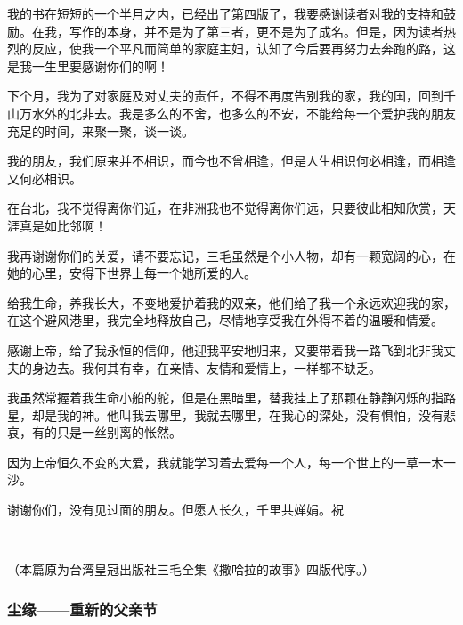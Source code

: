 \par 我的书在短短的一个半月之内，已经出了第四版了，我要感谢读者对我的支持和鼓励。在我，写作的本身，并不是为了第三者，更不是为了成名。但是，因为读者热烈的反应，使我一个平凡而简单的家庭主妇，认知了今后要再努力去奔跑的路，这是我一生里要感谢你们的啊！
\par 下个月，我为了对家庭及对丈夫的责任，不得不再度告别我的家，我的国，回到千山万水外的北非去。我是多么的不舍，也多么的不安，不能给每一个爱护我的朋友充足的时间，来聚一聚，谈一谈。
\par 我的朋友，我们原来并不相识，而今也不曾相逢，但是人生相识何必相逢，而相逢又何必相识。
\par 在台北，我不觉得离你们近，在非洲我也不觉得离你们远，只要彼此相知欣赏，天涯真是如比邻啊！
\par 我再谢谢你们的关爱，请不要忘记，三毛虽然是个小人物，却有一颗宽阔的心，在她的心里，安得下世界上每一个她所爱的人。
\par 给我生命，养我长大，不变地爱护着我的双亲，他们给了我一个永远欢迎我的家，在这个避风港里，我完全地释放自己，尽情地享受我在外得不着的温暖和情爱。
\par 感谢上帝，给了我永恒的信仰，他迎我平安地归来，又要带着我一路飞到北非我丈夫的身边去。我何其有幸，在亲情、友情和爱情上，一样都不缺乏。
\par 我虽然常握着我生命小船的舵，但是在黑暗里，替我挂上了那颗在静静闪烁的指路星，却是我的神。他叫我去哪里，我就去哪里，在我心的深处，没有惧怕，没有悲哀，有的只是一丝别离的怅然。
\par 因为上帝恒久不变的大爱，我就能学习着去爱每一个人，每一个世上的一草一木一沙。
\par 谢谢你们，没有见过面的朋友。但愿人长久，千里共婵娟。祝
\par{}
\par{}
\par  
\par （本篇原为台湾皇冠出版社三毛全集《撒哈拉的故事》四版代序。）


\subsubsection{尘缘——重新的父亲节}

